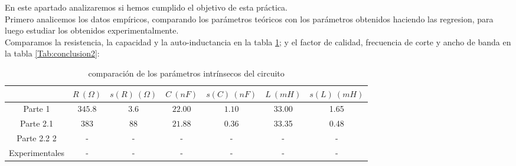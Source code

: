 \documentclass[12pt,a4paper]{article}
\begin{document}
En este apartado analizaremos si hemos cumplido el objetivo de esta práctica. \\

Primero analicemos los datos empíricos, comparando los parámetros teóricos con los parámetros obtenidos haciendo las regresion, para luego estudiar los obtenidos experimentalmente.\\

Comparamos la resistencia, la capacidad y la auto-inductancia en la tabla \ref{Tab:conclusion1}; y el factor de calidad, frecuencia de corte y ancho de banda en la tabla \ref{Tab:conclusion2}:

\begin{table}[h!] 	 \centering 
\begin{tabular}{c|c|c|c|c|c|c|} 

  & \cellcolor{color1} $ R \  (\Omega) $  &  \cellcolor{color1}  $s(R) \ (\Omega) $  &  \cellcolor{color1} $ C \ (nF)  $ & \cellcolor{color1}  $s(C) \ (nF)$  & \cellcolor{color1} $L \ (mH)$ & \cellcolor{color1} $s(L) \ (mH)$ \\ \hline 
 \cellcolor{color1} Parte 1 & \cellcolor{color2} $ 345.8 $  &  \cellcolor{color2} $3.6 $  &  \cellcolor{color2} $22.00  $ &  \cellcolor{color2} $ 1.10 $ &   \cellcolor{color2}33.00 &  \cellcolor{color2} 1.65  \\ \hline  
 \cellcolor{color1} Parte 2.1 &  \cellcolor{color2} $ 383 $  &  \cellcolor{color2} $88 $  &  \cellcolor{color2} $ 21.88  $ &  \cellcolor{color2} $ 0.36 $ &  \cellcolor{color2}  33.35 &  \cellcolor{color2} 0.48  \\ \hline  
 \cellcolor{color1} Parte 2.2 2&  \cellcolor{color2} - & \cellcolor{color2} - & \cellcolor{color2} - &  \cellcolor{color2} - & \cellcolor{color2} - & \cellcolor{color2} - \\ \hline  
 \cellcolor{color1} Experimentales &  \cellcolor{color2} - & \cellcolor{color2} - & \cellcolor{color2} - &  \cellcolor{color2} - & \cellcolor{color2} - & \cellcolor{color2} - \\ 
\hline
\end{tabular} 
\caption{comparación de los parámetros intrínsecos del circuito} 
\label{Tab:conclusion1} 
\end{table} 
\end{document}

